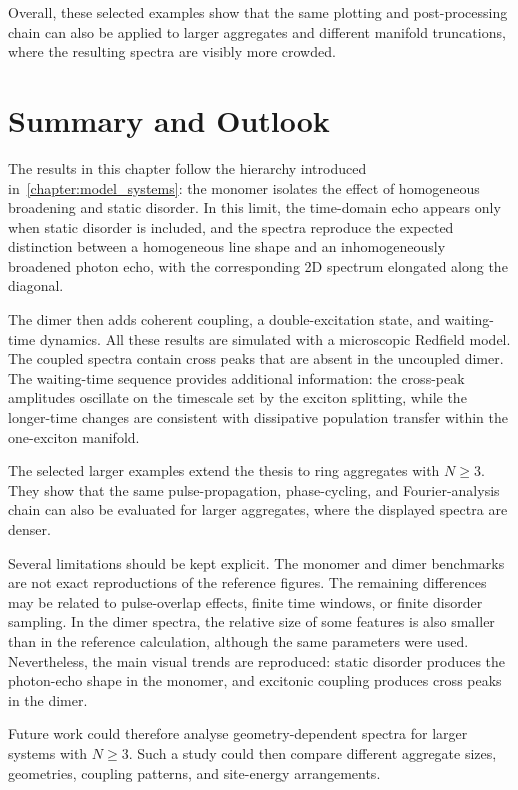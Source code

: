 Overall, these selected examples show that the same plotting and post-processing chain can also be applied to larger aggregates and different manifold truncations, where the resulting spectra are visibly more crowded.


\section{Summary and Outlook}
\label{sec:results_summary_outlook}

The results in this chapter follow the hierarchy introduced in~\autoref{chapter:model_systems}: the monomer isolates the effect of homogeneous broadening and static disorder. In this limit, the time-domain echo appears only when static disorder is included, and the spectra reproduce the expected distinction between a homogeneous line shape and an inhomogeneously broadened photon echo, with the corresponding 2D spectrum elongated along the diagonal.

The dimer then adds coherent coupling, a double-excitation state, and waiting-time dynamics. All these results are simulated with a microscopic Redfield model. The coupled spectra contain cross peaks that are absent in the uncoupled dimer. The waiting-time sequence provides additional information: the cross-peak amplitudes oscillate on the timescale set by the exciton splitting, while the longer-time changes are consistent with dissipative population transfer within the one-exciton manifold.

The selected larger examples extend the thesis to ring aggregates with \(N\ge 3\). They show that the same pulse-propagation, phase-cycling, and Fourier-analysis chain can also be evaluated for larger aggregates, where the displayed spectra are denser.

Several limitations should be kept explicit. The monomer and dimer benchmarks are not exact reproductions of the reference figures. The remaining differences may be related to pulse-overlap effects, finite time windows, or finite disorder sampling. In the dimer spectra, the relative size of some features is also smaller than in the reference calculation, although the same parameters were used. Nevertheless, the main visual trends are reproduced: static disorder produces the photon-echo shape in the monomer, and excitonic coupling produces cross peaks in the dimer.

Future work could therefore analyse geometry-dependent spectra for larger systems with \(N\ge 3\). Such a study could then compare different aggregate sizes, geometries, coupling patterns, and site-energy arrangements.

